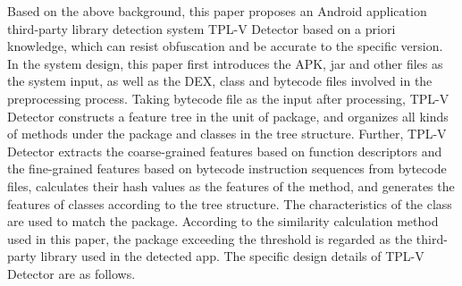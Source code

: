 \begin{digest}
Based on the above background, this paper proposes an Android application third-party library detection system TPL-V Detector based on a priori knowledge, which can resist obfuscation and be accurate to the specific version. In the system design, this paper first introduces the APK, jar and other files as the system input, as well as the DEX, class and bytecode files involved in the preprocessing process. Taking bytecode file as the input after processing, TPL-V Detector constructs a feature tree in the unit of package, and organizes all kinds of methods under the package and classes in the tree structure. Further, TPL-V Detector extracts the coarse-grained features based on function descriptors and the fine-grained features based on bytecode instruction sequences from bytecode files, calculates their hash values as the features of the method, and generates the features of classes according to the tree structure. The characteristics of the class are used to match the package. According to the similarity calculation method used in this paper, the package exceeding the threshold is regarded as the third-party library used in the detected app. The specific design details of TPL-V Detector are as follows.




\end{digest}
